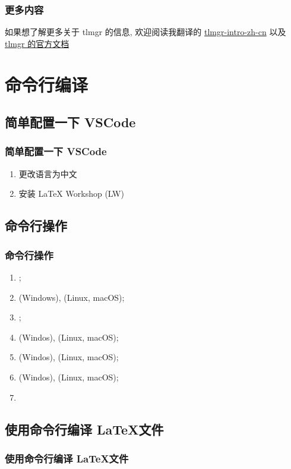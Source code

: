 \begin{frame}
  \frametitle{更多内容}
  如果想了解更多关于 tlmgr 的信息, 欢迎阅读我翻译的 \href{http://mirrors.ctan.org/info/tlmgr-intro-zh-cn/tlmgr-intro-zh-cn.pdf}{tlmgr-intro-zh-cn} 以及 \href{https://www.tug.org/texlive/doc/tlmgr.html}{tlmgr 的官方文档}
\end{frame}

\section{命令行编译}

\subsection{简单配置一下 VSCode}

\begin{frame}
  \frametitle{简单配置一下 VSCode}
  \begin{enumerate}[<+->]
    \item 更改语言为中文
    \item 安装 LaTeX Workshop (LW)
  \end{enumerate}
\end{frame}

\subsection{命令行操作}

\begin{frame}[fragile]
  \frametitle{命令行操作}
  \begin{enumerate}[<+->]
    \item {};
    \item {} (Windows),  (Linux, macOS);
    \item {};
    \item {} (Windos),  (Linux, macOS);
    \item {} (Windos),  (Linux, macOS);
    \item {} (Windos),  (Linux, macOS);
    \item {}
  \end{enumerate}
\end{frame}

\subsection{使用命令行编译 \LaTeX 文件}

\begin{frame}
  \frametitle{使用命令行编译 \LaTeX 文件}
\end{frame}
